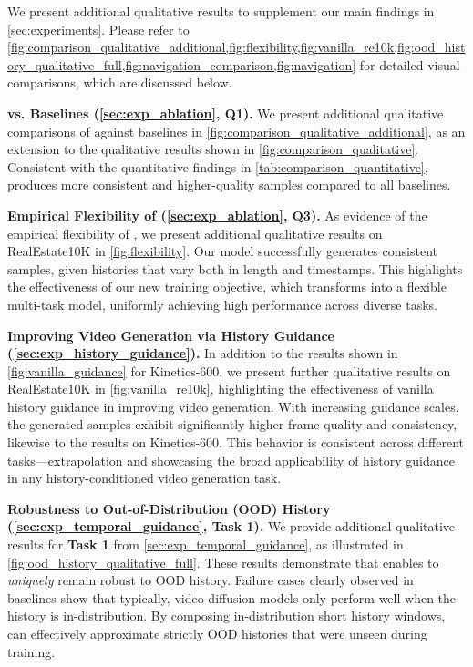 We present additional qualitative results to supplement our main findings in \cref{sec:experiments}. Please refer to \cref{fig:comparison_qualitative_additional,fig:flexibility,fig:vanilla_re10k,fig:ood_history_qualitative_full,fig:navigation_comparison,fig:navigation} for detailed visual comparisons, which are discussed below.

\textbf{\mtd vs. Baselines (\cref{sec:exp_ablation}, Q1).} We present additional qualitative comparisons of \mtd against baselines in \cref{fig:comparison_qualitative_additional}, as an extension to the qualitative results shown in \cref{fig:comparison_qualitative}. Consistent with the quantitative findings in \cref{tab:comparison_quantitative}, \mtd produces more consistent and higher-quality samples compared to all baselines.

\textbf{Empirical Flexibility of \mtd (\cref{sec:exp_ablation}, Q3).}
As evidence of the empirical flexibility of \mtd, we present additional qualitative results on RealEstate10K in \cref{fig:flexibility}. Our \mtd model successfully generates consistent samples, given histories that vary both in length and timestamps. This highlights the effectiveness of our new training objective, which transforms \mtd into a flexible multi-task model, uniformly achieving high performance across diverse tasks.

\textbf{Improving Video Generation via History Guidance (\cref{sec:exp_history_guidance}).} In addition to the results shown in \cref{fig:vanilla_guidance} for Kinetics-600, we present further qualitative results on RealEstate10K in \cref{fig:vanilla_re10k}, highlighting the effectiveness of vanilla history guidance in improving video generation. With increasing guidance scales, the generated samples exhibit significantly higher frame quality and consistency, likewise to the results on Kinetics-600. This behavior is consistent across different tasks—extrapolation and showcasing the broad applicability of history guidance in any history-conditioned video generation task.


\textbf{Robustness to Out-of-Distribution (OOD) History (\cref{sec:exp_temporal_guidance}, Task 1).} We provide additional qualitative results for \textbf{Task 1} from \cref{sec:exp_temporal_guidance}, as illustrated in \cref{fig:ood_history_qualitative_full}. These results demonstrate that \HGt enables \mtd to \emph{uniquely} remain robust to OOD history. Failure cases clearly observed in baselines show that typically, video diffusion models only perform well when the history is in-distribution. By composing in-distribution short history windows, \HGt can effectively approximate strictly OOD histories that were unseen during training.

